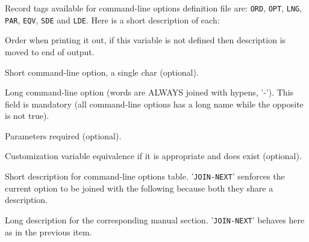 \documentclass[11pt]{article}
\begin{document}

Record tags available for command-line options definition file are: {\tt{}ORD}, {\tt{}OPT}, {\tt{}LNG}, {\tt{}PAR}, {\tt{}EQV}, {\tt{}SDE} and {\tt{}LDE}. Here is a short description of each:

\hfill\parbox{0.95\linewidth}{
\begin{description}\small\setlength{\itemsep}{0ex}\setlength{\parsep}{0ex}
\item[ {\tt{}ORD} ] Order when printing it out, if this variable is not defined then description is moved to end of output.
\item[ {\tt{}OPT} ] Short command-line option, a single char (optional).
\item[ {\tt{}LNG} ] Long command-line option (words are ALWAYS joined with hypens, '-'). This field is mandatory (all command-line options has a long name while the opposite is not true).
\item[ {\tt{}PAR} ] Parameters required (optional).
\item[ {\tt{}EQV} ] Customization variable equivalence if it is appropriate and does exist (optional).
\item[ {\tt{}SDE} ] Short description for command-line options table. '{\tt{}JOIN-NEXT}' senforces the current option to be joined with the following because both they share a description.
\item[ {\tt{}LDE} ] Long description for the corresponding manual section. '{\tt{}JOIN-NEXT}' behaves here as in the previous item.
\end{description}
} %
\hfill
\end{document}
